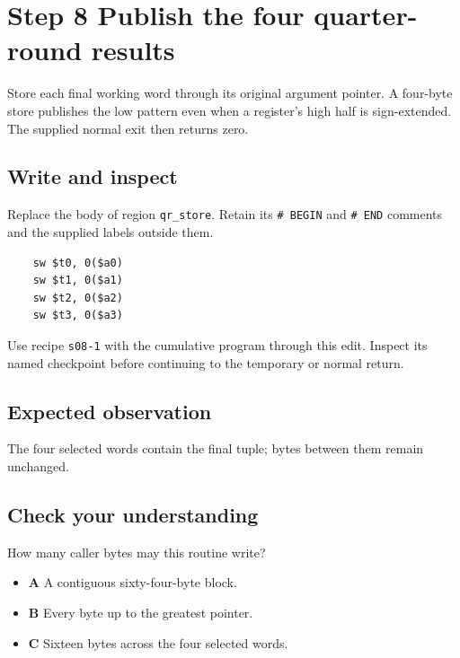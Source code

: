 \section{Step 8 Publish the four quarter-round results}\label{chacha-s08}

Store each final working word through its original argument pointer. A four-byte store publishes the low pattern even when a register's high half is sign-extended. The supplied normal exit then returns zero.

\subsection{Write and inspect}
Replace the body of region \texttt{qr\_store}. Retain its \texttt{\# BEGIN} and \texttt{\# END} comments and the supplied labels outside them.

\begin{verbatim}
    sw $t0, 0($a0)
    sw $t1, 0($a1)
    sw $t2, 0($a2)
    sw $t3, 0($a3)
\end{verbatim}

Use recipe \texttt{s08-1} with the cumulative program through this edit. Inspect its named checkpoint before continuing to the temporary or normal return.

\subsection{Expected observation}
The four selected words contain the final tuple; bytes between them remain unchanged.

\subsection{Check your understanding}
How many caller bytes may this routine write?

\begin{itemize}
  \item \textbf{A} A contiguous sixty-four-byte block.
  \item \textbf{B} Every byte up to the greatest pointer.
  \item \textbf{C} Sixteen bytes across the four selected words.
\end{itemize}
